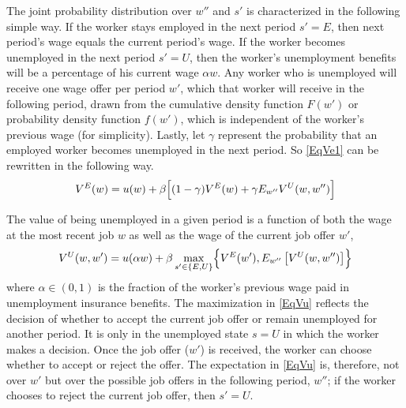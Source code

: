 The joint probability distribution over $w''$ and $s'$ is characterized in the following simple way. If the worker stays employed in the next period $s' = E$, then next period's wage equals the current period's wage. If the worker becomes unemployed in the next period $s' = U$, then the worker's unemployment benefits will be a percentage of his current wage $\alpha w$. Any worker who is unemployed will receive one wage offer per period $w'$, which that worker will receive in the following period, drawn from the cumulative density function $F(w')$ or probability density function $f(w')$, which is independent of the worker's previous wage (for simplicity). Lastly, let $\gamma$ represent the probability that an employed worker becomes unemployed in the next period. So \eqref{EqVe1} can be rewritten in the following way.
\begin{equation}\label{EqVe2}
   V^E(w) = u(w) + \beta \Bigl[(1-\gamma)V^E(w) + \gamma E_{w''}V^U(w,w'')\Bigr]
\end{equation}

The value of being unemployed in a given period is a function of both the wage at the most recent job $w$ as well as the wage of the current job offer $w'$,
\begin{equation}\label{EqVu}
   V^U(w,w') = u(\alpha w) + \beta\max_{s'\in\{E,U\}}\Bigl\{V^E(w'),E_{w''}\left[V^U(w,w'')\right]\Bigr\}
\end{equation}
where $\alpha\in(0,1)$ is the fraction of the worker's previous wage paid in unemployment insurance benefits. The maximization in \eqref{EqVu} reflects the decision of whether to accept the current job offer or remain unemployed for another period.  It is only in the unemployed state $s=U$ in which the worker makes a decision. Once the job offer ($w'$) is received, the worker can choose whether to accept or reject the offer. The expectation in \eqref{EqVu} is, therefore, not over $w'$ but over the possible job offers in the following period, $w''$; if the worker chooses to reject the current job offer, then $s' = U$.

